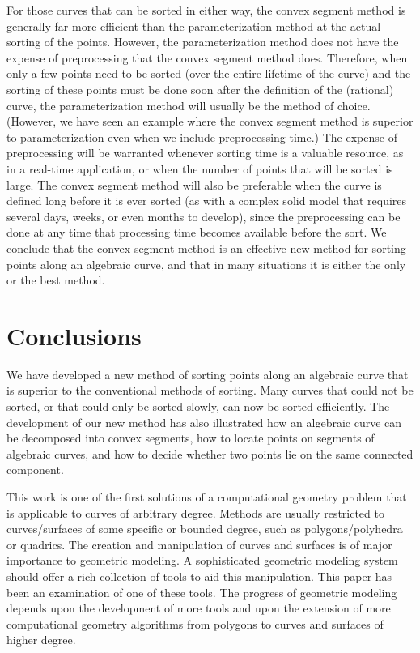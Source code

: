 For those curves that can be sorted in either way, the convex segment method 
is generally far more efficient than the parameterization method at the actual 
sorting of the points.
However, the parameterization method does not have the expense of 
preprocessing that the convex segment method does.
Therefore, when only a few points need to be sorted (over the entire lifetime 
of the curve) and the sorting of these points must be done soon after the 
definition of the (rational) curve, the parameterization method will usually 
be the method of choice.
(However, we have seen an example where the convex segment method is superior
to parameterization even when we include preprocessing time.)
The expense of preprocessing will be warranted whenever sorting time is a 
valuable resource, as in a real-time application, or when the number of points 
that will be sorted is large.
The convex segment method will also be preferable when the curve is defined 
long before it is ever sorted (as with a complex solid model that requires 
several days, weeks, or even months to develop), since the preprocessing can 
be done at any time that processing time becomes available before the sort.
We conclude that the convex segment method is an effective new method for
sorting points along an algebraic curve, and that in many situations it is 
either the only or the best method.

\section{Conclusions}
\label{sco}
We have developed a new method of sorting points along an algebraic curve
that is superior to the conventional methods of sorting.
Many curves that could not be sorted, or that could only be sorted slowly,
can now be sorted efficiently.
The development of our new method has also illustrated how an algebraic curve can 
be decomposed into convex segments, how to locate points on segments 
of algebraic curves, and how to decide whether two points lie on the same
connected component.

This work is one of the first solutions
of a computational geometry problem that is applicable to curves of arbitrary degree.
Methods are usually restricted to curves/surfaces of some specific or 
bounded degree, such as polygons/polyhedra or quadrics.
The creation and manipulation of curves and surfaces is of major importance 
to geometric modeling.
A sophisticated geometric modeling system should offer 
a rich collection of tools to aid this manipulation.
This paper has been an examination of one of these tools.
The progress of geometric modeling depends upon the development of more tools and upon 
the extension of more computational geometry algorithms from polygons to curves and 
surfaces of higher degree.

